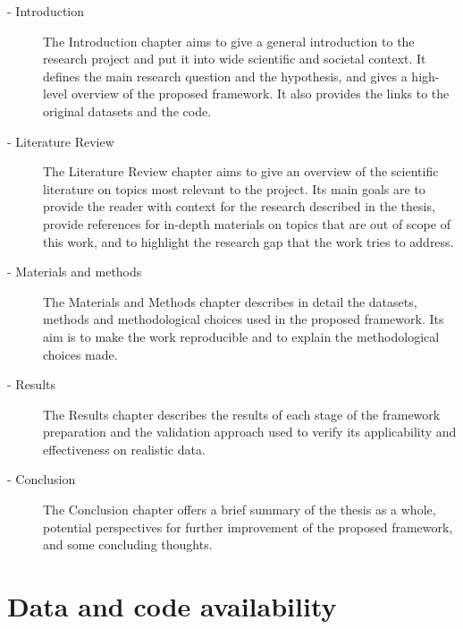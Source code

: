 \begin{description}
    \item[ - Introduction]
The Introduction chapter aims to give a general introduction to the research project and put it into wide scientific and societal context.
It defines the main research question and the hypothesis, and gives a high-level overview of the proposed framework.
It also provides the links to the original datasets and the code.

    \item[ - Literature Review]
The Literature Review chapter aims to give an overview of the scientific literature on topics most relevant to the project.
Its main goals are to provide the reader with context for the research described in the thesis, provide references for in-depth materials on topics that are out of scope of this work, and to highlight the research gap that the work tries to address.

	\item[ - Materials and methods]
The Materials and Methods chapter describes in detail the datasets, methods and methodological choices used in the proposed framework.
Its aim is to make the work reproducible and to explain the methodological choices made.

	\item[ - Results]
The Results chapter describes the results of each stage of the framework preparation and the validation approach used to verify its applicability and effectiveness on realistic data.

    \item[ - Conclusion]
The Conclusion chapter offers a brief summary of the thesis as a whole, potential perspectives for further improvement of the proposed framework, and some concluding thoughts.

\end{description}

\section{Data and code availability}

